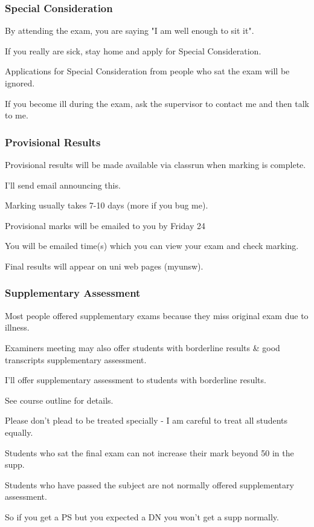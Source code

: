 \begin{frame}
\frametitle{Special Consideration}

By attending the exam, you are saying "I am well enough to sit it".

If you really are sick, stay home and apply for Special Consideration.

Applications for Special Consideration from people who sat the exam
will be ignored.

If you become ill during the exam, ask the supervisor to contact me
and then talk to me.
\end{frame}

\begin{frame}
\frametitle{Provisional Results}

Provisional results will be made available via classrun when marking is complete.

I'll send email announcing this.

Marking usually takes 7-10 days (more if you bug me).

Provisional marks will be emailed to you by Friday 24 

You will be emailed time(s) which you can view your exam and check marking. 

Final results will appear on  uni web pages (myunsw).
\end{frame}

\begin{frame}
\frametitle{Supplementary Assessment}

Most people offered  supplementary exams because they miss original
exam due to illness.

Examiners meeting may also offer students with borderline results
\& good transcripts supplementary assessment. 

I'll offer supplementary assessment to students with borderline results.

See course outline for details.

Please don't plead to be treated specially - I am careful to treat all students equally.

Students who sat the final exam can not increase their mark beyond 50 in the supp.

Students who have passed the subject are not normally offered supplementary assessment.

So if you get a PS but you expected a DN you won't get a supp normally.

\end{frame}


